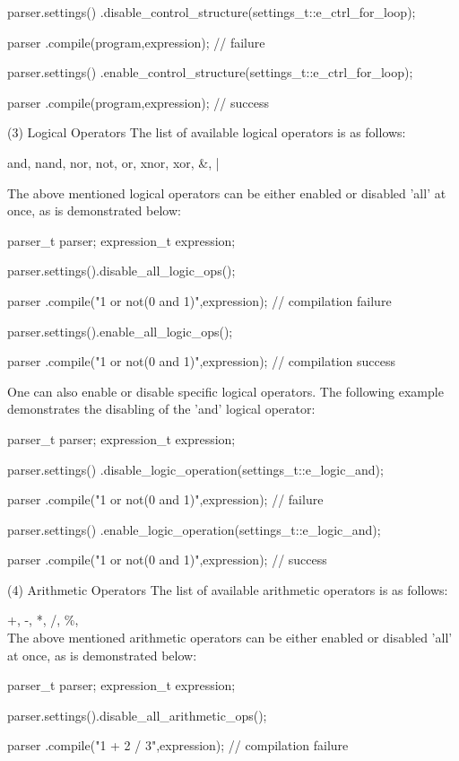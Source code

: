 parser.settings()
.disable\_control\_structure(settings\_t::e\_ctrl\_for\_loop);

parser
.compile(program,expression); // failure

parser.settings()
.enable\_control\_structure(settings\_t::e\_ctrl\_for\_loop);

parser
.compile(program,expression); // success


(3) Logical Operators
The list of available logical operators is as follows:

and, nand, nor, not, or, xnor, xor, \&, |


The  above  mentioned  logical  operators  can  be  either  enabled or
disabled 'all' at once, as is demonstrated below:

parser\_t parser;
expression\_t expression;

parser.settings().disable\_all\_logic\_ops();

parser
.compile("1 or not(0 and 1)",expression); // compilation failure

parser.settings().enable\_all\_logic\_ops();

parser
.compile("1 or not(0 and 1)",expression); // compilation success


One  can  also  enable  or  disable  specific  logical  operators. The
following  example  demonstrates  the disabling  of the  'and' logical
operator:

parser\_t parser;
expression\_t expression;

parser.settings()
.disable\_logic\_operation(settings\_t::e\_logic\_and);

parser
.compile("1 or not(0 and 1)",expression); // failure

parser.settings()
.enable\_logic\_operation(settings\_t::e\_logic\_and);

parser
.compile("1 or not(0 and 1)",expression); // success


(4) Arithmetic Operators
The list of available arithmetic operators is as follows:

+, -, *, /, \%, \^\\


The  above mentioned  arithmetic operators  can be  either enabled  or
disabled 'all' at once, as is demonstrated below:

parser\_t parser;
expression\_t expression;

parser.settings().disable\_all\_arithmetic\_ops();

parser
.compile("1 + 2 / 3",expression); // compilation failure

